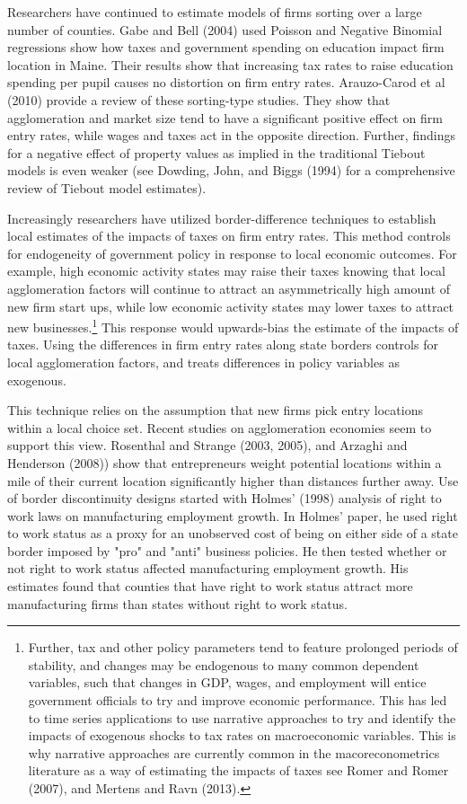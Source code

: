 \documentclass[12pt,a4paper]{article}
\begin{document}
Researchers have continued to estimate models of firms sorting over a large number of counties. Gabe and Bell (2004) used Poisson and Negative Binomial regressions show how taxes and government spending on education impact firm location in Maine. Their results show that increasing tax rates to raise education spending per pupil causes no distortion on firm entry rates. Arauzo-Carod et al (2010) provide a review of these sorting-type studies. They show that agglomeration and market size tend to have a significant positive effect on firm entry rates, while wages and taxes act in the opposite direction. Further, findings for a negative effect of property values as implied in the traditional Tiebout models is even weaker (see Dowding, John, and Biggs (1994) for a comprehensive review of Tiebout model estimates). 

Increasingly researchers have utilized border-difference techniques to establish local estimates of the impacts of taxes on firm entry rates. This method controls for endogeneity of government policy in response to local economic outcomes. For example, high economic activity states may raise their taxes knowing that local agglomeration factors will continue to attract an asymmetrically high amount of new firm start ups, while low economic activity states may lower taxes to attract new businesses.\footnote{Further, tax and other policy parameters tend to feature prolonged periods of stability, and changes may be endogenous to many common dependent variables, such that changes in GDP, wages, and employment will entice government officials to try and improve economic performance. This has led to time series applications to use narrative approaches to try and identify the impacts of exogenous shocks to tax rates on macroeconomic variables. This is why narrative approaches are currently common in the macoreconometrics literature as a way of estimating the impacts of taxes see Romer and Romer (2007), and Mertens and Ravn (2013).} This response would upwards-bias the estimate of the impacts of taxes. Using the differences in firm entry rates along state borders controls for local agglomeration factors, and treats differences in policy variables as exogenous.

This technique relies on the assumption that new firms pick entry locations within a local choice set. Recent studies on agglomeration economies seem to support this view.  Rosenthal and Strange (2003, 2005), and Arzaghi and Henderson (2008)) show that entrepreneurs weight potential locations within a mile of their current location significantly higher than distances further away. Use of border discontinuity designs started with Holmes’ (1998) analysis of right to work laws on manufacturing employment growth. In Holmes' paper, he used right to work status as a proxy for an unobserved cost of being on either side of a state border imposed by "pro" and "anti" business policies. He then tested whether or not right to work status affected manufacturing employment growth. His estimates found that counties that have right to work status attract more manufacturing firms than states without right to work status.
\end{document}
